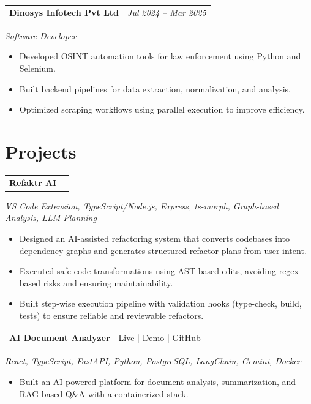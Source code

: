 \documentclass[a4paper,10pt]{article}
\begin{document}
\vspace{4pt}

\noindent
\begin{tabularx}{\textwidth}{@{}X r@{}}
  \textbf{Dinosys Infotech Pvt Ltd} & \textit{Jul 2024 – Mar 2025}
\end{tabularx}
\textit{Software Developer}

\begin{itemize}
  \item Developed OSINT automation tools for law enforcement using Python and Selenium.
  \item Built backend pipelines for data extraction, normalization, and analysis.
  \item Optimized scraping workflows using parallel execution to improve efficiency.
\end{itemize}

\section*{Projects}



\noindent
\begin{tabularx}{\textwidth}{@{}X r@{}}
  \textbf{Refaktr AI} &
\end{tabularx}
\textit{VS Code Extension, TypeScript/Node.js, Express, ts-morph, Graph-based Analysis, LLM Planning}
\begin{itemize}
  \item Designed an AI-assisted refactoring system that converts codebases into dependency graphs and generates structured refactor plans from user intent.
  \item Executed safe code transformations using AST-based edits, avoiding regex-based risks and ensuring maintainability.
  \item Built step-wise execution pipeline with validation hooks (type-check, build, tests) to ensure reliable and reviewable refactors.
\end{itemize}

\vspace{4pt}

\noindent
\begin{tabularx}{\textwidth}{@{}X r@{}}
  \textbf{AI Document Analyzer} &
  \href{https://example.com/demo}{\small Live} \;|\;
  \href{https://example.com/demo-video}{\small Demo} \;|\;
  \href{https://github.com/alex-example/sample-project}{\small GitHub}
\end{tabularx}
\textit{React, TypeScript, FastAPI, Python, PostgreSQL, LangChain, Gemini, Docker}
\begin{itemize}
  \item Built an AI-powered platform for document analysis, summarization, and RAG-based Q\&A with a containerized stack.
\end{itemize}
\end{document}
